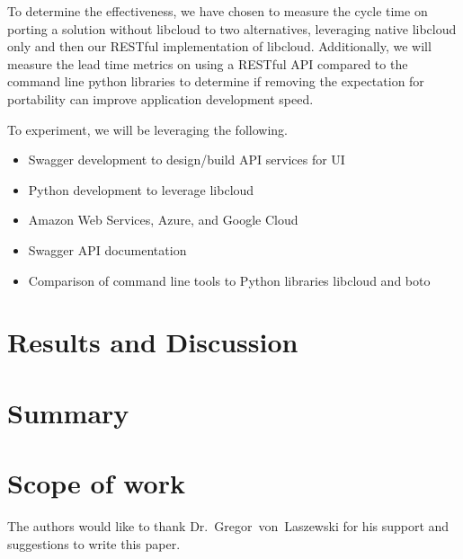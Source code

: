 To determine the effectiveness, we have chosen to measure the cycle time on porting a 
solution without libcloud to two alternatives, leveraging native libcloud only and then 
our RESTful implementation of libcloud. Additionally, we will measure the lead time 
metrics on using a RESTful API compared to the command line python libraries to determine
if removing the expectation for portability can improve application development speed.

To experiment, we will be leveraging the following.

\begin{itemize}
    \item
    Swagger development to design/build API services for UI
  \item
    Python development to leverage libcloud
  \item
    Amazon Web Services, Azure, and Google Cloud
  \end{itemize}

\begin{itemize}
\item
  Swagger API documentation
\item
  Comparison of command line tools to Python libraries libcloud and boto
\end{itemize}


\section{Results and Discussion}



\section{Summary}

\section{Scope of work}\label{scope-of-work}

\begin{acks}

  The authors would like to thank Dr.~Gregor~von~Laszewski for his
  support and suggestions to write this paper.

\end{acks}


 

